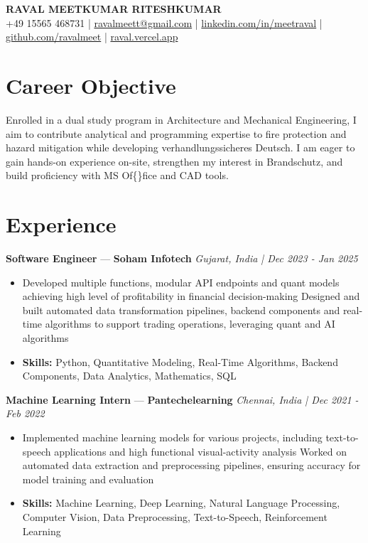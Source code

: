 \documentclass[a4paper,10pt]{article}
\begin{document}
\begin{center}
  {\Large\bfseries RAVAL MEETKUMAR RITESHKUMAR}\\[2pt]
  {\small +49 15565 468731 \;|\; \href{mailto:ravalmeett@gmail.com}{ravalmeett@gmail.com} \;|\; \href{https://www.linkedin.com/in/meetraval/}{linkedin.com/in/meetraval} \;|\; \href{https://github.com/ravalmeet}{github.com/ravalmeet} \;|\; \href{https://raval.vercel.app/}{raval.vercel.app}}
\end{center}
\vspace{-3pt}

\section*{Career Objective}
Enrolled in a dual study program in Architecture and Mechanical Engineering, I aim to contribute analytical and programming expertise to fire protection and hazard mitigation while developing verhandlungssicheres Deutsch. I am eager to gain hands-on experience on-site, strengthen my interest in Brandschutz, and build proficiency with MS Of\{\}fice and CAD tools.\par

\section*{Experience}
\textbf{Software Engineer} — \textbf{Soham Infotech} \hfill \textit{Gujarat, India \;|\; Dec 2023 - Jan 2025}\par
\vspace{1pt}
\begin{itemize}
  \item Developed multiple functions, modular API endpoints and quant models achieving high level of profitability in financial decision-making Designed and built automated data transformation pipelines, backend components and real-time algorithms to support trading operations, leveraging quant and AI algorithms
  \item \textbf{Skills:} Python, Quantitative Modeling, Real-Time Algorithms, Backend Components, Data Analytics, Mathematics, SQL
\end{itemize}
\vspace{3pt}
\textbf{Machine Learning Intern} — \textbf{Pantechelearning} \hfill \textit{Chennai, India \;|\; Dec 2021 - Feb 2022}\par
\vspace{1pt}
\begin{itemize}
  \item Implemented machine learning models for various projects, including text-to-speech applications and high functional visual-activity analysis Worked on automated data extraction and preprocessing pipelines, ensuring accuracy for model training and evaluation
  \item \textbf{Skills:} Machine Learning, Deep Learning, Natural Language Processing, Computer Vision, Data Preprocessing, Text-to-Speech, Reinforcement Learning
\end{itemize}
\end{document}
